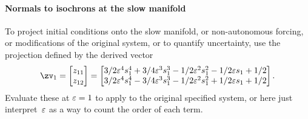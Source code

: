 \paragraph{Normals to isochrons at the slow manifold}
To project initial conditions
onto the slow manifold, or non-autonomous
forcing, or modifications of the original system, or to quantify uncertainty, use the projection defined by the derived vector
\begin{equation*}
\zv_1=\begin{bmatrix}z_{11}\\z_{12}\end{bmatrix}
=\begin{bmatrix}
3/2 \eps^{4} s_{1}^{4}+3/4 \eps^{3} s_{1}^{3}-1/2 \eps^{2} s_{1}
^{2}-1/2 \eps s_{1}+1/2
\\
3/2 \eps^{4} s_{1}^{4}-3/4 \eps^{3} s_{1}^{3}-1/2 \eps^{2} s_{1}
^{2}+1/2 \eps s_{1}+1/2
\end{bmatrix}.
\end{equation*}
Evaluate these at \(\varepsilon=1\) to apply to the original specified system, or here just interpret~\(\varepsilon\) as a way to count the order of each term.


